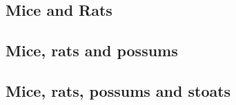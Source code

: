 \documentclass[]{book}
\begin{document}
\hypertarget{mice-and-rats}{%
\subsection{Mice and Rats}\label{mice-and-rats}}

\hypertarget{mice-rats-and-possums}{%
\subsection{Mice, rats and possums}\label{mice-rats-and-possums}}

\hypertarget{mice-rats-possums-and-stoats}{%
\subsection{Mice, rats, possums and stoats}\label{mice-rats-possums-and-stoats}}


\end{document}

